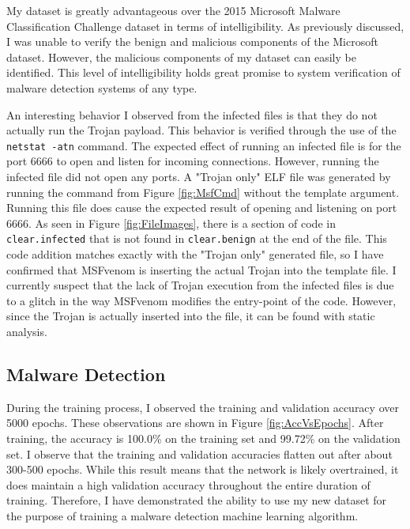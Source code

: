 \documentclass[12pt, letterpaper, titlepage]{article}
\newcommand{\figRef}[1]{Figure \ref{#1}}
\newcommand{\msfv}{MSFvenom}
\newcommand{\maxTrainingEpochs}{5000}
\newcommand{\trainAccuracy}{100.0\%}
\newcommand{\testAccuracy}{99.72\%}
\begin{document}
My dataset is greatly advantageous over the 2015 Microsoft Malware Classification Challenge dataset \cite{Ronen2018} in terms of intelligibility.
As previously discussed, I was unable to verify the benign and malicious components of the Microsoft dataset.
However, the malicious components of my dataset can easily be identified.
This level of intelligibility holds great promise to system verification of malware detection systems of any type.

An interesting behavior I observed from the infected files is that they do not actually run the Trojan payload.
This behavior is verified through the use of the \verb|netstat -atn| command.
The expected effect of running an infected file is for the port 6666 to open and listen for incoming connections.
However, running the infected file did not open any ports.
A "Trojan only" ELF file was generated by running the command from \figRef{fig:MsfCmd} without the template argument.
Running this file does cause the expected result of opening and listening on port 6666.
As seen in \figRef{fig:FileImages}, there is a section of code in \verb|clear.infected| that is not found in \verb|clear.benign| at the end of the file.
This code addition matches exactly with the "Trojan only" generated file, so I have confirmed that \msfv{} is inserting the actual Trojan into the template file.
I currently suspect that the lack of Trojan execution from the infected files is due to a glitch in the way \msfv{} modifies the entry-point of the code.
However, since the Trojan is actually inserted into the file, it can be found with static analysis.

\subsection{Malware Detection}
During the training process, I observed the training and validation accuracy over \maxTrainingEpochs{} epochs.
These observations are shown in \figRef{fig:AccVsEpochs}.
After training, the accuracy is \trainAccuracy{} on the training set and \testAccuracy{} on the validation set.
I observe that the training and validation accuracies flatten out after about 300-500 epochs.
While this result means that the network is likely overtrained, it does maintain a high validation accuracy throughout the entire duration of training.
Therefore, I have demonstrated the ability to use my new dataset for the purpose of training a malware detection machine learning algorithm.
\end{document}
